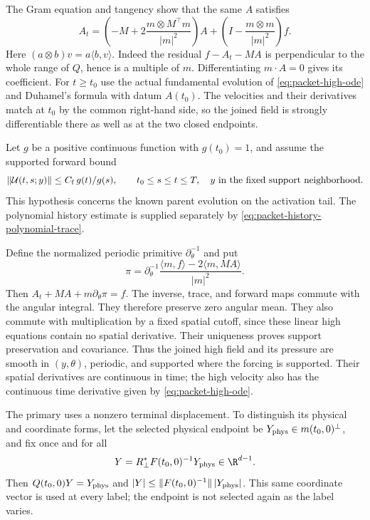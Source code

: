 The Gram equation and tangency show that the same $A$ satisfies
\begin{equation}\label{eq:packet-high-ode}
 A_t=\left(-M+2\frac{m\otimes M^{\top}m}{|m|^2}\right)A
       +\left(I-\frac{m\otimes m}{|m|^2}\right)f.
\end{equation}
Here $(a\otimes b)v=a\langle b,v\rangle$. Indeed the residual
$f-A_t-MA$ is perpendicular to the whole range of $Q$, hence is a
multiple of $m$. Differentiating $m\cdot A=0$ gives its coefficient.
For $t\ge t_0$ use the actual fundamental evolution of
\eqref{eq:packet-high-ode} and Duhamel's formula with datum $A(t_0)$.
The velocities and their derivatives match at $t_0$ by the common
right-hand side, so the joined field is strongly differentiable there
as well as at the two closed endpoints.

Let $g$ be a positive continuous function with $g(t_0)=1$, and assume
the supported forward bound
\begin{equation}\label{eq:packet-tail-propagator}
 \|\mathcal U(t,s;y)\|\le C_{\rm f}\,g(t)/g(s),
 \qquad t_0\le s\le t\le T,
 \quad y\text{ in the fixed support neighborhood}.
\end{equation}
This hypothesis concerns the known parent evolution on the activation
tail. The polynomial history estimate is supplied separately by
\eqref{eq:packet-history-polynomial-trace}.

Define the normalized periodic primitive $\partial_\theta^{-1}$ and put
\begin{equation}\label{eq:packet-high-pressure}
 \pi=\partial_\theta^{-1}
       \frac{\langle m,f\rangle-2\langle m,MA\rangle}{|m|^2}.
\end{equation}
Then $A_t+MA+m\partial_\theta\pi=f$. The inverse, trace, and forward
maps commute with the angular integral. They therefore preserve zero
angular mean. They also commute with multiplication by a fixed spatial
cutoff, since these linear high equations contain no spatial derivative.
Their uniqueness proves support preservation and covariance. Thus the
joined high field and its pressure are smooth in $(y,\theta)$, periodic,
and supported where the forcing is supported. Their spatial derivatives
are continuous in time; the high velocity also has the continuous time
derivative given by \eqref{eq:packet-high-ode}.

The primary uses a nonzero terminal displacement. To distinguish its
physical and coordinate forms, let the selected physical endpoint be
$Y_{\rm phys}\in m(t_0,0)^\perp$, and fix once and for all
\[
 Y=R_\perp^*F(t_0,0)^{-1}Y_{\rm phys}\in\R^{d-1}.
\]
Then $Q(t_0,0)Y=Y_{\rm phys}$ and
$|Y|\le\|F(t_0,0)^{-1}\|\,|Y_{\rm phys}|$. This same coordinate
vector is used at every label; the endpoint is not selected again as
the label varies.

